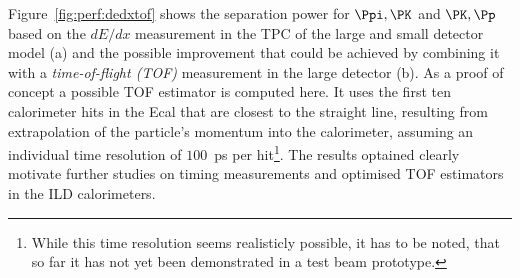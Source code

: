 Figure~\ref{fig:perf:dedxtof} shows the separation power
for $\Ppi,\PK$ and $\PK,\Pp$  based on the $dE/dx$ measurement in the TPC of the large and small detector model (a)
and the possible improvement that could be achieved by combining it with a  {\em time-of-flight (TOF)} measurement in the large detector (b).
As a proof of concept a possible TOF estimator is computed here. It uses the first ten calorimeter hits in the Ecal that are closest to the straight line,
resulting from extrapolation of the particle's momentum into the calorimeter, assuming an individual time resolution of $100$~ps
per hit\footnote{While this time resolution seems realisticly possible, it has to be noted, that so far it has not yet been demonstrated
 in a test beam prototype.}. The results optained clearly motivate further studies on timing measurements and optimised TOF estimators
in the ILD calorimeters.
%
% 
